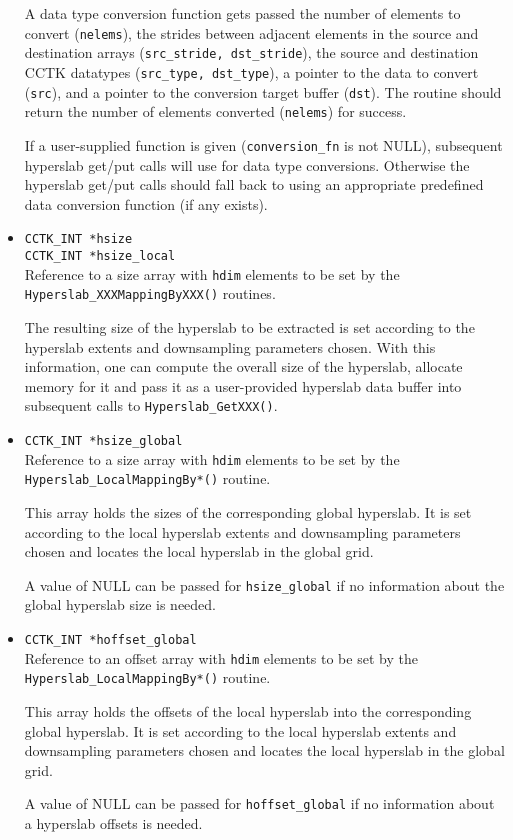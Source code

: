 \documentclass{article}
\begin{document}
\begin{itemize}
    A data type conversion function gets passed the number of elements to
    convert ({\tt nelems}), the strides between adjacent elements in the
    source and destination arrays ({\tt src\_stride, dst\_stride}),
    the source and destination CCTK datatypes ({\tt src\_type, dst\_type}),
    a pointer to the data to convert ({\tt src}), and a pointer to
    the conversion target buffer ({\tt dst}).
    The routine should return the number of elements converted ({\tt nelems})
    for success.

    If a user-supplied function is given ({\tt conversion\_fn} is not NULL),
    subsequent hyperslab get/put calls will use for data type conversions.
    Otherwise the hyperslab get/put calls should fall
    back to using an appropriate predefined data conversion function (if any exists).

  \item{\tt CCTK\_INT *hsize\\
    CCTK\_INT *hsize\_local}\\
    Reference to a size array with {\tt hdim} elements to be set by the
    {\tt Hyperslab\_XXXMappingByXXX()} routines.

    The resulting size of the hyperslab to be extracted is set
    according to the hyperslab extents and downsampling parameters chosen.
    With this information, one can compute the overall size of the hyperslab,
    allocate memory for it and pass it as a user-provided hyperslab data buffer
    into subsequent calls to {\tt Hyperslab\_GetXXX()}.

  \item{\tt CCTK\_INT *hsize\_global}\\
    Reference to a size array with {\tt hdim} elements to be set by the
    {\tt Hyperslab\_LocalMappingBy*()} routine.

    This array holds the sizes of the corresponding global hyperslab.
    It is set according to the local hyperslab extents and downsampling
    parameters chosen and locates the local hyperslab in the global grid.

    A value of NULL can be passed for {\tt hsize\_global} if no information
    about the global hyperslab size is needed.

  \item{\tt CCTK\_INT *hoffset\_global}\\
    Reference to an offset array with {\tt hdim} elements to be set by the
    {\tt Hyperslab\_LocalMappingBy*()} routine.

    This array holds the offsets of the local hyperslab into the
    corresponding global hyperslab. It is set according to the local
    hyperslab extents and downsampling parameters chosen and locates the local
    hyperslab in the global grid.

    A value of NULL can be passed for {\tt hoffset\_global} if no information
    about a hyperslab offsets is needed.
\end{itemize}
\end{document}
